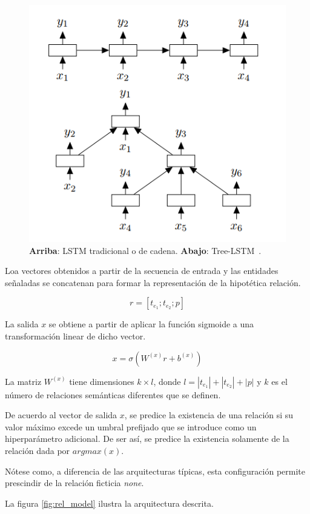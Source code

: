 \begin{figure}[h!]
	\centering
	\includegraphics[width=0.7\linewidth]{Graphics/lstm_cmp.png}
	\caption{\textbf{Arriba}: LSTM tradicional o de cadena. \textbf{Abajo}: Tree-LSTM~\cite{tai2015improved}.}\label{fig:lstm_cmp}
\end{figure}

Loa vectores obtenidos a partir de la secuencia de entrada y las entidades señaladas se concatenan para formar la representación de la hipotética relación.

\begin{equation*}
	r = [t_{e_1}; t_{e_2}; p]
\end{equation*}

La salida $x$ se obtiene a partir de aplicar la función sigmoide a una transformación linear de dicho vector.

\begin{equation*}
	x = \sigma(W^{(x)}r + b^{(x)})
\end{equation*}

La matriz $W^{(x)}$ tiene dimensiones $k \times l$, donde $l = |t_{e_1}| + |t_{e_2}| + |p|$ y $k$ es el número de relaciones semánticas diferentes que se definen.

De acuerdo al vector de salida $x$, se predice la existencia de una relación si su valor máximo excede un umbral prefijado que se introduce como un hiperparámetro adicional. De ser así, se predice la existencia solamente de la relación dada por $argmax(x)$.
	
Nótese como, a diferencia de las arquitecturas típicas, esta configuración permite prescindir de la relación ficticia \textit{none}.

La figura \ref{fig:rel_model} ilustra la arquitectura descrita.

